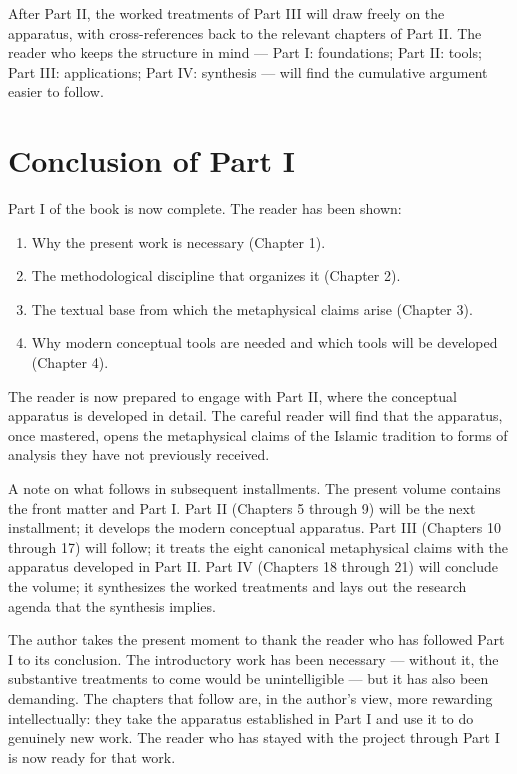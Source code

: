After Part II, the worked treatments of Part III will draw freely on
the apparatus, with cross-references back to the relevant chapters
of Part II. The reader who keeps the structure in mind --- Part I:
foundations; Part II: tools; Part III: applications; Part IV:
synthesis --- will find the cumulative argument easier to follow.

\section{Conclusion of Part I}

Part I of the book is now complete. The reader has been shown:

\begin{enumerate}[leftmargin=2em]
    \item Why the present work is necessary (Chapter 1).
    \item The methodological discipline that organizes it (Chapter
    2).
    \item The textual base from which the metaphysical claims arise
    (Chapter 3).
    \item Why modern conceptual tools are needed and which tools
    will be developed (Chapter 4).
\end{enumerate}

The reader is now prepared to engage with Part II, where the
conceptual apparatus is developed in detail. The careful reader will
find that the apparatus, once mastered, opens the metaphysical
claims of the Islamic tradition to forms of analysis they have not
previously received.

A note on what follows in subsequent installments. The present
volume contains the front matter and Part I. Part II (Chapters 5
through 9) will be the next installment; it develops the modern
conceptual apparatus. Part III (Chapters 10 through 17) will follow;
it treats the eight canonical metaphysical claims with the apparatus
developed in Part II. Part IV (Chapters 18 through 21) will conclude
the volume; it synthesizes the worked treatments and lays out the
research agenda that the synthesis implies.

The author takes the present moment to thank the reader who has
followed Part I to its conclusion. The introductory work has been
necessary --- without it, the substantive treatments to come would
be unintelligible --- but it has also been demanding. The chapters
that follow are, in the author's view, more rewarding intellectually:
they take the apparatus established in Part I and use it to do
genuinely new work. The reader who has stayed with the project
through Part I is now ready for that work.


